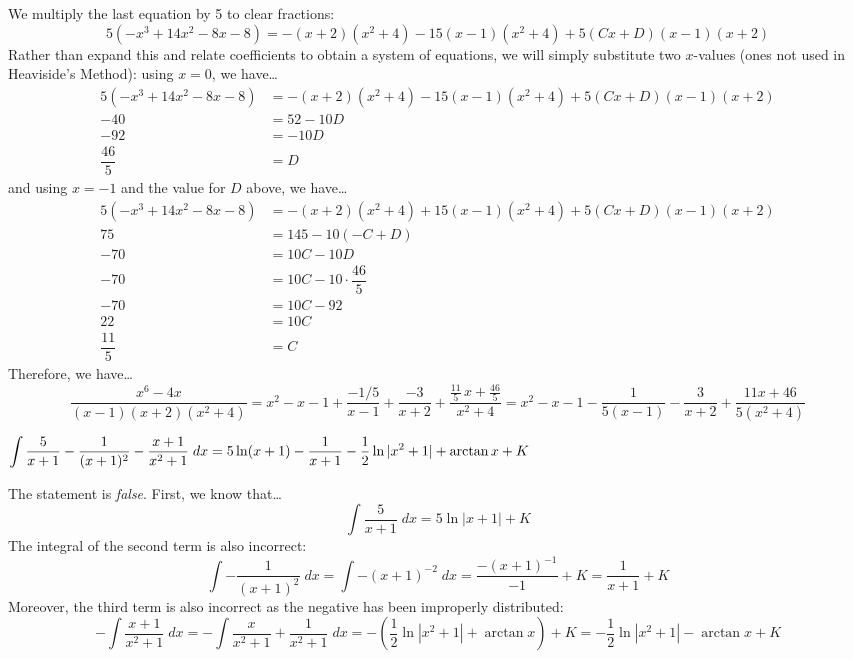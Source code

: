\documentclass[11pt,letterpaper]{article}
\begin{document}
We multiply the last equation by 5 to clear fractions:
	\[
	5(-x^3 + 14x^2 - 8x - 8)= -(x + 2)(x^2 + 4) - 15(x - 1)(x^2 + 4) + 5(Cx + D)(x - 1)(x + 2)
	\]
Rather than expand this and relate coefficients to obtain a system of equations, we will simply substitute two $x$-values (ones not used in Heaviside's Method): using $x= 0$, we have\dots
	\[
	\begin{aligned}
	5(-x^3 + 14x^2 - 8x - 8)&= -(x + 2)(x^2 + 4) - 15(x - 1)(x^2 + 4) + 5(Cx + D)(x - 1)(x + 2) \\
	-40&= 52 - 10D \\
	-92&= -10 D \\
	\dfrac{46}{5}&= D
	\end{aligned}
	\]
and using $x= -1$ and the value for $D$ above, we have\dots
	\[
	\begin{aligned}
	5(-x^3 + 14x^2 - 8x - 8)&= -(x + 2)(x^2 + 4) + 15(x - 1)(x^2 + 4) + 5(Cx + D)(x - 1)(x + 2) \\
	75&= 145 - 10 (-C + D) \\
	-70&= 10C - 10D \\
	-70&= 10C - 10 \cdot \dfrac{46}{5} \\
	-70&= 10C - 92 \\
	22&= 10C \\
	\dfrac{11}{5}&= C
	\end{aligned}
	\]
Therefore, we have\dots
	\[
	\dfrac{x^6 - 4x}{(x - 1)(x + 2)(x^2 + 4)}= x^2 - x - 1 + \dfrac{-1/5}{x - 1} + \dfrac{-3}{x + 2} + \dfrac{\frac{11}{5}\,x + \frac{46}{5}}{x^2 + 4}= x^2 - x - 1 - \dfrac{1}{5(x - 1)} - \dfrac{3}{x + 2} + \dfrac{11x + 46}{5(x^2 + 4)}
	\] \pvspace{1.3cm}



 $\displaystyle\int \dfrac{5}{x + 1} - \dfrac{1}{(x + 1)^2} - \dfrac{x + 1}{x^2 + 1} \;dx= 5 \ln(x + 1) - \dfrac{1}{x + 1} - \frac{1}{2} \ln|x^2 + 1| + \arctan x + K$ \pspace

\sol The statement is \textit{false}. First, we know that\dots
	\[
	\int \dfrac{5}{x + 1} \;dx= 5 \ln|x + 1| + K
	\]
The integral of the second term is also incorrect:
	\[
	\int -\dfrac{1}{(x + 1)^2} \;dx= \int -(x + 1)^{-2} \;dx= \dfrac{-(x + 1)^{-1}}{-1} + K= \dfrac{1}{x + 1} + K
	\]
Moreover, the third term is also incorrect as the negative has been improperly distributed:
	\[
	- \int \dfrac{x + 1}{x^2 + 1} \;dx= -\int \dfrac{x}{x^2 + 1} + \dfrac{1}{x^2 + 1} \;dx= - \left( \frac{1}{2} \ln|x^2 + 1| + \arctan x \right) + K= -\frac{1}{2} \ln|x^2 + 1| - \arctan x + K
	\]



\end{document}
